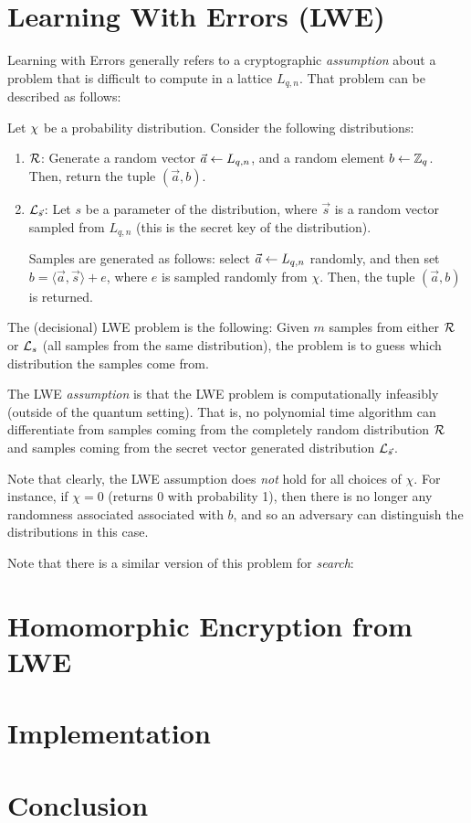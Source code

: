 \documentclass{theme}
\newcommand{\innerprod}[1]{\langle #1 \rangle}
\begin{document}
\section{Learning With Errors (LWE)}

Learning with Errors generally refers to a cryptographic \textit{assumption} about a problem that is difficult to compute in a lattice $L_{q, n}$. That problem can be described as follows:

\begin{ndefinition}
    Let $\mathcal{\chi}$ be a probability distribution. Consider the following distributions:

    \begin{enumerate}
        \item $\mathcal{R}$: Generate a random vector $\vec{a} \leftarrow L_{q,n}$, and a random element $b \leftarrow \mathbb{Z}_q$. Then, return the tuple $(\vec{a},b)$.
        \item $\mathcal{L}_{\vec{s}}$: Let $s$ be a parameter of the distribution, where $\vec{s}$ is a random vector sampled from $L_{q,n}$ (this is the secret key of the distribution).

        Samples are generated as follows: select $\vec{a} \leftarrow L_{q,n}$ randomly, and then set $b = \innerprod{\vec{a}, \vec{s}} + e$, where $e$ is sampled randomly from $\chi$. Then, the tuple $(\vec{a}, b)$ is returned. 
    \end{enumerate}

    The (decisional) LWE problem is the following: Given $m$ samples from either $\mathcal{R}$ or $\mathcal{L}_s$ (all samples from the same distribution), the problem is to guess which distribution the samples come from.

    The LWE \textit{assumption} is that the LWE problem is computationally infeasibly (outside of the quantum setting). That is, no polynomial time algorithm can differentiate from samples coming from the completely random distribution $\mathcal{R}$ and samples coming from the secret vector generated distribution $\mathcal{L}_{\vec{s}}$.
\end{ndefinition}

Note that clearly, the LWE assumption does \textit{not} hold for all choices of $\chi$. For instance, if $\chi = 0$ (returns 0 with probability 1), then there is no longer any randomness associated associated with $b$, and so an adversary can distinguish the distributions in this case.

Note that there is a similar version of this problem for \textit{search}:

\begin{ndefinition}
    
\end{ndefinition}

\section{Homomorphic Encryption from LWE}

\section{Implementation}

\section{Conclusion}
\end{document}
